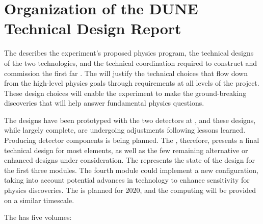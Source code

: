 \section{Organization of the DUNE Technical Design Report}

The   describes the experiment's proposed physics program, the 
technical designs of the two   technologies, and the technical coordination required to construct and commission the first far .
The  will 
justify the technical choices that flow down from the high-level physics goals through requirements at all levels of the project. These design choices will enable the  experiment to make the ground-breaking discoveries that will help answer 
fundamental physics questions. 

The   designs have been prototyped with the two  detectors at , and these designs, while largely complete, are undergoing adjustments following lessons learned. Producing detector components is being planned. 
The  , therefore, presents a final technical design for most elements, as well as the few remaining alternative or enhanced designs under consideration. The  represents the state of the design for the first three   modules.
The fourth module could implement a new  configuration, taking into account  potential advances in technology to enhance sensitivity for physics discoveries. 
 The   is planned for 2020, and the computing  will be provided on a similar timescale.

The    has five volumes:

